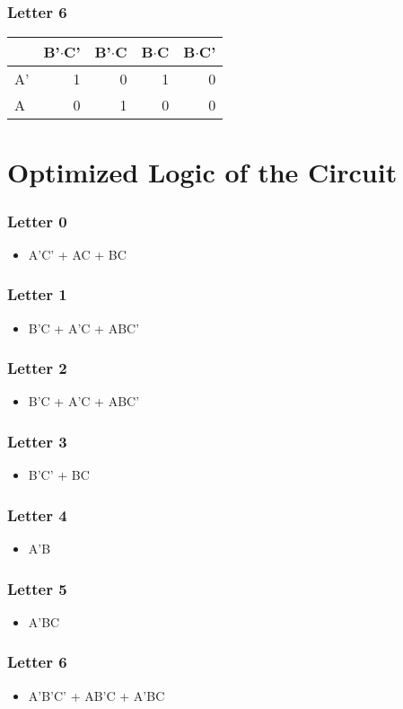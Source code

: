 \documentclass[11pt]{article}
\begin{document}
\subsubsection{Letter 6}
\label{sec-2-0-7}
\begin{center}
\begin{tabular}{lrrrr}
 & B'$\cdot$C' & B'$\cdot$C & B$\cdot$C & B$\cdot$C'\\
\hline
A' & 1 & 0 & 1 & 0\\
A & 0 & 1 & 0 & 0\\
\end{tabular}
\end{center}

\section{Optimized Logic of the Circuit}
\label{sec-3}
\subsubsection{Letter 0}
\label{sec-3-0-1}
\begin{itemize}
\item A'C' + AC + BC
\end{itemize}
\subsubsection{Letter 1}
\label{sec-3-0-2}
\begin{itemize}
\item B'C + A'C + ABC'
\end{itemize}
\subsubsection{Letter 2}
\label{sec-3-0-3}
\begin{itemize}
\item B'C + A'C + ABC'
\end{itemize}
\subsubsection{Letter 3}
\label{sec-3-0-4}
\begin{itemize}
\item B'C' + BC
\end{itemize}
\subsubsection{Letter 4}
\label{sec-3-0-5}
\begin{itemize}
\item A'B
\end{itemize}
\subsubsection{Letter 5}
\label{sec-3-0-6}
\begin{itemize}
\item A'BC
\end{itemize}
\subsubsection{Letter 6}
\label{sec-3-0-7}
\begin{itemize}
\item A'B'C' + AB'C + A'BC
\end{itemize}
\end{document}
